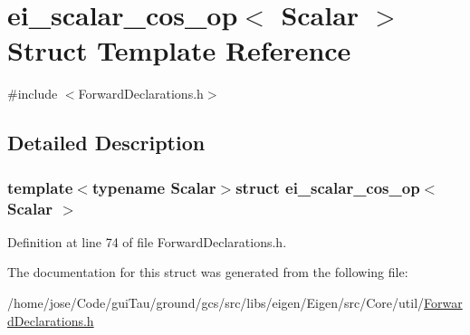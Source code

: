 \hypertarget{structei__scalar__cos__op}{\section{ei\-\_\-scalar\-\_\-cos\-\_\-op$<$ Scalar $>$ Struct Template Reference}
\label{structei__scalar__cos__op}
}


{\ttfamily \#include $<$Forward\-Declarations.\-h$>$}



\subsection{Detailed Description}
\subsubsection*{template$<$typename Scalar$>$struct ei\-\_\-scalar\-\_\-cos\-\_\-op$<$ Scalar $>$}



Definition at line 74 of file Forward\-Declarations.\-h.



The documentation for this struct was generated from the following file\-:\begin{DoxyCompactItemize}
\item 
/home/jose/\-Code/gui\-Tau/ground/gcs/src/libs/eigen/\-Eigen/src/\-Core/util/\hyperlink{_forward_declarations_8h}{Forward\-Declarations.\-h}\end{DoxyCompactItemize}
